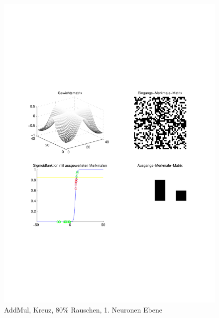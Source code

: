 \begin{figure}[hbt]
	\begin{minipage}{0.8 \textwidth}
		\includegraphics[width=\textwidth]{./Bilder/Auswertung/Endergebnis/TypeAddMul_Rauschen80_Cross_Layer1}
		\caption{AddMul, Kreuz, 80\% Rauschen, 1. Neuronen Ebene}
		\label{AddMul_Kreuz_80_1}
	\end{minipage}
	\vfill
	\begin{minipage}{0.8 \textwidth}

\end{minipage}
\end{figure}
